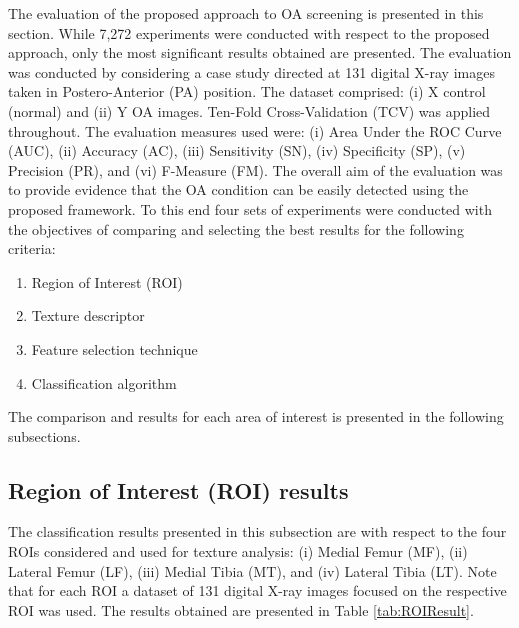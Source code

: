 \documentclass[review]{elsarticle}
\begin{document}
The evaluation of the proposed approach to OA screening is presented in this section. While 7,272 experiments were conducted with respect to the proposed approach, only the most significant results obtained are presented. The evaluation was conducted by considering a case study directed at 131 digital X-ray images taken in Postero-Anterior (PA) position. The dataset comprised: (i) X control (normal) and (ii) Y OA images. Ten-Fold Cross-Validation (TCV) was applied throughout. The evaluation measures used were: (i) Area Under the ROC Curve (AUC), (ii) Accuracy (AC), (iii) Sensitivity (SN), (iv) Specificity (SP), (v) Precision (PR), and (vi) F-Measure (FM). The overall aim of the evaluation was to provide evidence that the OA condition can be easily detected using the proposed framework. To this end four sets of experiments were conducted with the objectives of comparing and selecting the best results for the following criteria:

\begin{enumerate}
\item Region of Interest (ROI)
\item Texture descriptor
\item Feature selection technique
\item Classification algorithm
\end{enumerate}



The comparison and results for each area of interest is presented in the following subsections.

\subsection{Region of Interest (ROI) results}

The classification results presented in this subsection are with respect to the four ROIs considered and used for texture analysis: (i) Medial Femur (MF), (ii) Lateral Femur (LF), (iii) Medial Tibia (MT), and (iv) Lateral Tibia (LT). Note that for each ROI a dataset of 131 digital X-ray images focused on the respective ROI was used. The results obtained are presented in Table \ref{tab:ROIResult}. \\
\end{document}
